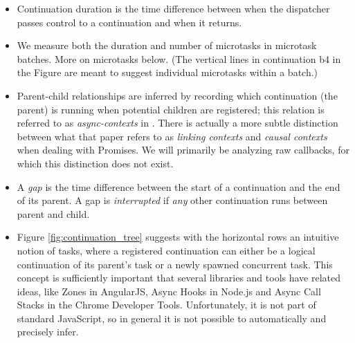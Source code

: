 \documentclass[acmsmall,anonymous,review]{acmart}\settopmatter{printfolios=true,printccs=false,printacmref=false}
\begin{document}
\begin{itemize}
\item Continuation duration is the time difference between when the dispatcher passes control to a continuation and when it returns.
\item We measure both the duration and number of microtasks in microtask batches.
  More on microtasks below.
  (The vertical lines in continuation b4 in the Figure are meant to suggest individual microtasks within a batch.)
\item Parent-child relationships are inferred by recording which continuation (the parent) is running when potential children are registered; this relation is referred to as \emph{async-contexts} in \cite{Loring2017}.
  There is actually a more subtle distinction between what that paper refers to as \emph{linking contexts} and \emph{causal contexts} when dealing with Promises.
  We will primarily be analyzing raw callbacks, for which this distinction does not exist.
\item A \emph{gap} is the time difference between the start of a continuation and the end of its parent.
  A gap is \emph{interrupted} if \emph{any} other continuation runs between parent and child.
\item Figure \ref{fig:continuation_tree} suggests with the horizontal rows an intuitive notion of tasks, where a registered continuation can either be a logical continuation of its parent's task or a newly spawned concurrent task.
  This concept is sufficiently important that several libraries and tools have related ideas, like Zones in AngularJS, Async Hooks in Node.js and Async Call Stacks in the Chrome Developer Tools.
  Unfortunately, it is not part of standard JavaScript, so in general it is not possible to automatically and precisely infer.
\end{itemize}

\end{document}
